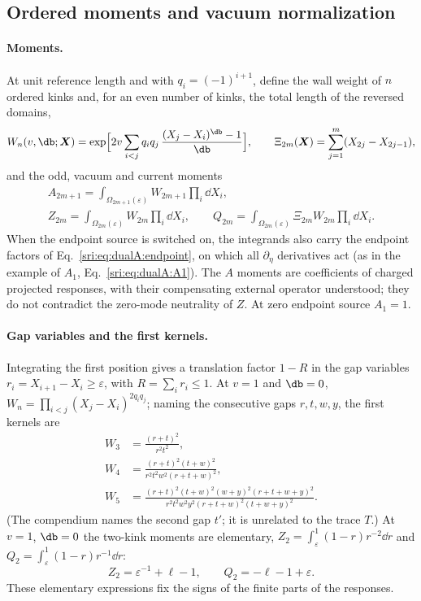 \subsection{Ordered moments and vacuum normalization}\label{sri:app:dualA:moments}
\paragraph{Moments.} At unit reference length and with $q_i=(-1)^{i+1}$, define the wall weight of $n$ ordered kinks
and, for an even number of kinks, the total length of the reversed domains,
\begin{equation}
 W_n(v,\db;\boldsymbol X)=\exp\Bigl[2v\sum_{i<j}q_iq_j\,\frac{(X_j-X_i)^{\db}-1}{\db}\Bigr],\qquad
 \Xi_{2m}(\boldsymbol X)=\sum_{j=1}^m(X_{2j}-X_{2j-1}),
\end{equation}
and the odd, vacuum and current moments
\begin{equation}
\begin{gathered}
 A_{2m+1}=\int_{\Omega_{2m+1}(\varepsilon)}W_{2m+1}\prod_i\dd X_i,\\
 Z_{2m}=\int_{\Omega_{2m}(\varepsilon)}W_{2m}\prod_i\dd X_i,\qquad
 Q_{2m}=\int_{\Omega_{2m}(\varepsilon)}\Xi_{2m}W_{2m}\prod_i\dd X_i.
\end{gathered}
 \label{sri:eq:dualA:moments}
\end{equation}
When the endpoint source is switched on, the integrands also carry the endpoint factors of
Eq.~\eqref{sri:eq:dualA:endpoint}, on which all $\partial_\eta$ derivatives act (as in the example of $A_1$,
Eq.~\eqref{sri:eq:dualA:A1}). The $A$ moments are coefficients of charged projected responses, with their compensating
external operator understood; they do not contradict the zero-mode neutrality of $Z$. At zero endpoint source
$A_1=1$.

\paragraph{Gap variables and the first kernels.} Integrating the first position gives a translation factor $1-R$
in the gap variables $r_i=X_{i+1}-X_i\ge\varepsilon$, with $R=\sum_ir_i\le1$. At $v=1$ and $\db=0$,
$W_n=\prod_{i<j}(X_j-X_i)^{2q_iq_j}$; naming the consecutive gaps $r,t,w,y$, the first kernels are
\begin{align}
 W_3&=\frac{(r+t)^2}{r^2t^2},\label{sri:eq:dualA:W3}\\
 W_4&=\frac{(r+t)^2(t+w)^2}{r^2t^2w^2(r+t+w)^2},\label{sri:eq:dualA:W4}\\
 W_5&=\frac{(r+t)^2(t+w)^2(w+y)^2(r+t+w+y)^2}{r^2t^2w^2y^2(r+t+w)^2(t+w+y)^2}.\label{sri:eq:dualA:W5}
\end{align}
(The compendium names the second gap $t'$; it is unrelated to the trace $T$.) At $v=1$, $\db=0$ the two-kink moments
are elementary, $Z_2=\int_\varepsilon^1(1-r)r^{-2}\dd r$ and $Q_2=\int_\varepsilon^1(1-r)r^{-1}\dd r$:
\begin{equation}
 Z_2=\varepsilon^{-1}+\ell-1,\qquad Q_2=-\ell-1+\varepsilon.
 \label{sri:eq:dualA:Z2Q2}
\end{equation}
These elementary expressions fix the signs of the finite parts of the responses.

